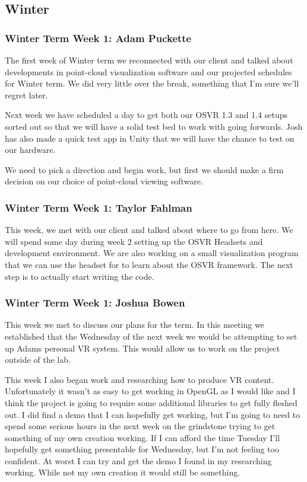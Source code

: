 \documentclass[draftclsnofoot,onecolumn]{IEEEtran}
\begin{document}
\subsection{Winter}

\subsubsection{Winter Term Week 1: Adam Puckette}

The first week of Winter term we reconnected with our client and talked about developments in point-cloud visualization software and our projected schedules for Winter term. We did very little over the break, something that I'm sure we'll regret later.

Next week we have scheduled a day to get both our OSVR 1.3 and 1.4 setups sorted out so that we will have a solid test bed to work with going forwards. Josh has also made a quick test app in Unity that we will have the chance to test on our hardware.

We need to pick a direction and begin work, but first we should make a firm decision on our choice of point-cloud viewing software.

\subsubsection{Winter Term Week 1: Taylor Fahlman}

This week, we met with our client and talked about where to go from here. We will spend some day during week 2 setting up the OSVR Headsets and development environment. We are also working on a small visualization program that we can use the headset for to learn about the OSVR framework. The next step is to actually start writing the code.

\subsubsection{Winter Term Week 1: Joshua Bowen}

This week we met to discuss our plans for the term. In this meeting we established that the Wednesday of the next week we would be attempting to set up Adams personal VR system. This would allow us to work on the project outside of the lab.

This week I also began work and researching how to produce VR content. Unfortunately it wasn't as easy to get working in OpenGL as I would like and I think the project is going to require some additional libraries to get fully fleshed out. I did find a demo that I can hopefully get working, but I'm going to need to spend some serious hours in the next week on the grindstone trying to get something of my own creation working. If I can afford the time Tuesday I'll hopefully get something presentable for Wednesday, but I'm not feeling too confident. At worst I can try and get the demo I found in my researching working. While not my own creation it would still be something.
\end{document}
